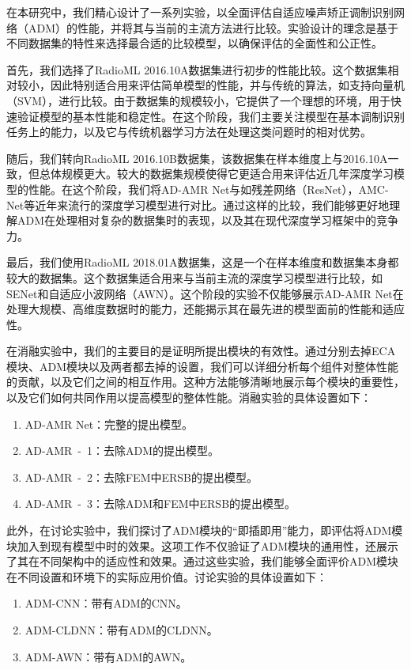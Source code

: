 在本研究中，我们精心设计了一系列实验，以全面评估自适应噪声矫正调制识别网络（ADM）的性能，并将其与当前的主流方法进行比较。实验设计的理念是基于不同数据集的特性来选择最合适的比较模型，以确保评估的全面性和公正性。

首先，我们选择了RadioML 2016.10A数据集进行初步的性能比较。这个数据集相对较小，因此特别适合用来评估简单模型的性能，并与传统的算法，如支持向量机（SVM），进行比较。由于数据集的规模较小，它提供了一个理想的环境，用于快速验证模型的基本性能和稳定性。在这个阶段，我们主要关注模型在基本调制识别任务上的能力，以及它与传统机器学习方法在处理这类问题时的相对优势。

随后，我们转向RadioML 2016.10B数据集，该数据集在样本维度上与2016.10A一致，但总体规模更大。较大的数据集规模使得它更适合用来评估近几年深度学习模型的性能。在这个阶段，我们将AD-AMR Net与如残差网络（ResNet），AMC-Net等近年来流行的深度学习模型进行对比。通过这样的比较，我们能够更好地理解ADM在处理相对复杂的数据集时的表现，以及其在现代深度学习框架中的竞争力。

最后，我们使用RadioML 2018.01A数据集，这是一个在样本维度和数据集本身都较大的数据集。这个数据集适合用来与当前主流的深度学习模型进行比较，如SENet和自适应小波网络（AWN）。这个阶段的实验不仅能够展示AD-AMR Net在处理大规模、高维度数据时的能力，还能揭示其在最先进的模型面前的性能和适应性。

在消融实验中，我们的主要目的是证明所提出模块的有效性。通过分别去掉ECA模块、ADM模块以及两者都去掉的设置，我们可以详细分析每个组件对整体性能的贡献，以及它们之间的相互作用。这种方法能够清晰地展示每个模块的重要性，以及它们如何共同作用以提高模型的整体性能。消融实验的具体设置如下：
\begin{enumerate}
    \item AD-AMR Net：完整的提出模型。

    \item AD-AMR~-~1：去除ADM的提出模型。

    \item AD-AMR~-~2：去除FEM中ERSB的提出模型。

    \item AD-AMR~-~3：去除ADM和FEM中ERSB的提出模型。
\end{enumerate}

此外，在讨论实验中，我们探讨了ADM模块的“即插即用”能力，即评估将ADM模块加入到现有模型中时的效果。这项工作不仅验证了ADM模块的通用性，还展示了其在不同架构中的适应性和效果。通过这些实验，我们能够全面评价ADM模块在不同设置和环境下的实际应用价值。讨论实验的具体设置如下：
\begin{enumerate}
    \item ADM-CNN：带有ADM的CNN。
    \item ADM-CLDNN：带有ADM的CLDNN。
    \item ADM-AWN：带有ADM的AWN。
\end{enumerate}

